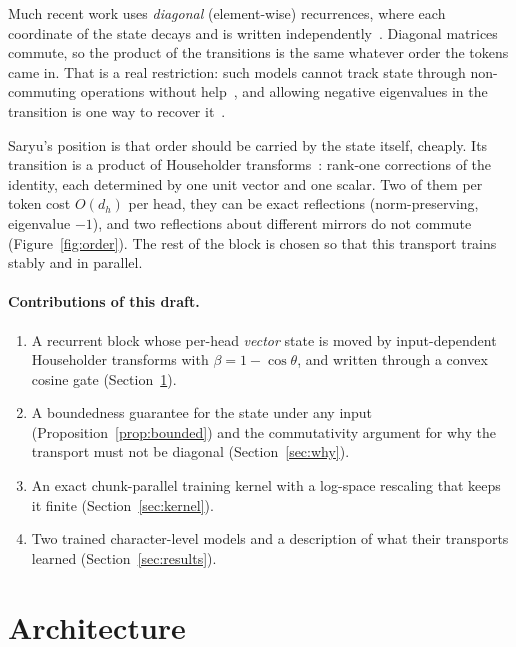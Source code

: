 \documentclass[10pt]{article}
\begin{document}
Much recent work uses \emph{diagonal} (element-wise) recurrences, where each coordinate of the state
decays and is written independently~\cite{gu2023mamba}. Diagonal matrices commute, so the product of
the transitions is the same whatever order the tokens came in. That is a real restriction: such
models cannot track state through non-commuting operations without help~\cite{merrill2024,sarrof2024},
and allowing negative eigenvalues in the transition is one way to recover
it~\cite{grazzi2024}.

Saryu's position is that order should be carried by the state itself, cheaply. Its transition is a
product of Householder transforms~\cite{householder1958}: rank-one corrections of the identity, each
determined by one unit vector and one scalar. Two of them per token cost $O(d_h)$ per head, they can be
exact reflections (norm-preserving, eigenvalue $-1$), and two reflections about different mirrors do not
commute (Figure~\ref{fig:order}). The rest of the block is chosen so that this transport trains
stably and in parallel.

\paragraph{Contributions of this draft.}
\begin{enumerate}[leftmargin=*,itemsep=1pt]
  \item A recurrent block whose per-head \emph{vector} state is moved by input-dependent Householder
        transforms with $\beta=1-\cos\theta$, and written through a convex cosine gate
        (Section~\ref{sec:arch}).
  \item A boundedness guarantee for the state under any input (Proposition~\ref{prop:bounded}) and the
        commutativity argument for why the transport must not be diagonal
        (Section~\ref{sec:why}).
  \item An exact chunk-parallel training kernel with a log-space rescaling that keeps it finite
        (Section~\ref{sec:kernel}).
  \item Two trained character-level models and a description of what their transports learned
        (Section~\ref{sec:results}).
\end{enumerate}

\section{Architecture}
\label{sec:arch}
\end{document}
